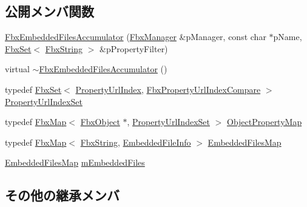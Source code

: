 \subsection*{公開メンバ関数}
\begin{DoxyCompactItemize}
\item 
\hyperlink{class_fbx_embedded_files_accumulator_a22c32a739a59987e432fabe5f46c460e}{Fbx\+Embedded\+Files\+Accumulator} (\hyperlink{class_fbx_manager}{Fbx\+Manager} \&p\+Manager, const char $\ast$p\+Name, \hyperlink{class_fbx_set}{Fbx\+Set}$<$ \hyperlink{class_fbx_string}{Fbx\+String} $>$ \&p\+Property\+Filter)
\item 
virtual \hyperlink{class_fbx_embedded_files_accumulator_ade239c37b1e2bc5b772c50a1caa55173}{$\sim$\+Fbx\+Embedded\+Files\+Accumulator} ()
\end{DoxyCompactItemize}
\begin{DoxyCompactItemize}
\item 
typedef \hyperlink{class_fbx_set}{Fbx\+Set}$<$ \hyperlink{struct_fbx_embedded_files_accumulator_1_1_property_url_index}{Property\+Url\+Index}, \hyperlink{struct_fbx_embedded_files_accumulator_1_1_fbx_property_url_index_compare}{Fbx\+Property\+Url\+Index\+Compare} $>$ \hyperlink{class_fbx_embedded_files_accumulator_a007ad10c417fc8b5373ab6358f5fb5be}{Property\+Url\+Index\+Set}
\item 
typedef \hyperlink{class_fbx_map}{Fbx\+Map}$<$ \hyperlink{class_fbx_object}{Fbx\+Object} $\ast$, \hyperlink{class_fbx_embedded_files_accumulator_a007ad10c417fc8b5373ab6358f5fb5be}{Property\+Url\+Index\+Set} $>$ \hyperlink{class_fbx_embedded_files_accumulator_abc919e5ba3486530790dcd7ef90b8eed}{Object\+Property\+Map}
\end{DoxyCompactItemize}
\begin{DoxyCompactItemize}
\item 
typedef \hyperlink{class_fbx_map}{Fbx\+Map}$<$ \hyperlink{class_fbx_string}{Fbx\+String}, \hyperlink{struct_fbx_embedded_files_accumulator_1_1_embedded_file_info}{Embedded\+File\+Info} $>$ \hyperlink{class_fbx_embedded_files_accumulator_a7471092a2496b1e45a263f91ea3db731}{Embedded\+Files\+Map}
\item 
\hyperlink{class_fbx_embedded_files_accumulator_a7471092a2496b1e45a263f91ea3db731}{Embedded\+Files\+Map} \hyperlink{class_fbx_embedded_files_accumulator_a41e3d4c6054110af6df9a53066634dc8}{m\+Embedded\+Files}
\end{DoxyCompactItemize}
\subsection*{その他の継承メンバ}


